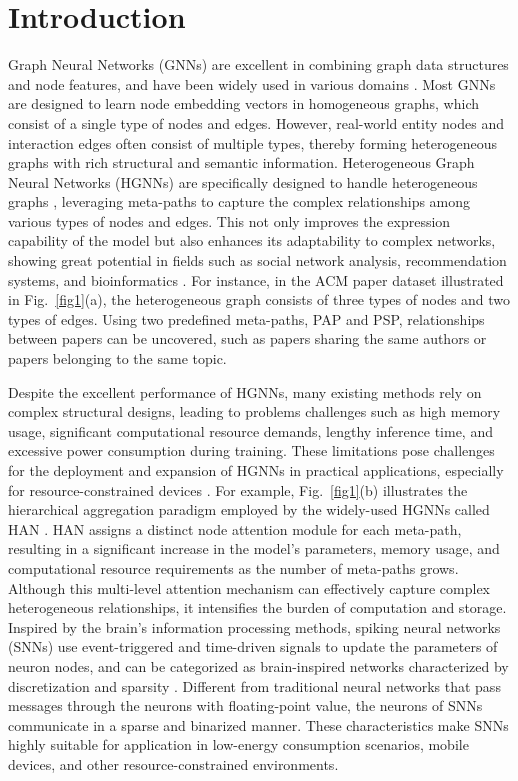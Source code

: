 \documentclass[letterpaper]{article} %
\begin{document}
\section{Introduction}

Graph Neural Networks (GNNs) are excellent in combining graph data structures and node features, and have been widely used in various domains \cite{bib1,bib2,bib3,bib4}. Most GNNs are designed to learn node embedding vectors in homogeneous graphs, which consist of a single type of nodes and edges. However, real-world entity nodes and interaction edges often consist of multiple types, thereby forming heterogeneous graphs with rich structural and semantic information. Heterogeneous Graph Neural Networks (HGNNs) are specifically designed to handle heterogeneous graphs \cite{bib5}, leveraging meta-paths to capture the complex relationships among various types of nodes and edges. This not only improves the expression capability of the model but also enhances its adaptability to complex networks, showing great potential in fields such as social network analysis, recommendation systems, and bioinformatics \cite{bib6,bib7,bib8}. For instance, in the ACM paper dataset illustrated in Fig.~\ref{fig1}(a), the heterogeneous graph consists of three types of nodes and two types of edges. Using two predefined meta-paths, PAP and PSP, relationships between papers can be uncovered, such as papers sharing the same authors or papers belonging to the same topic.

Despite the excellent performance of HGNNs, many existing methods rely on complex structural designs, leading to problems challenges such as high memory usage, significant computational resource demands, lengthy inference time, and excessive power consumption during training. These limitations pose challenges for the deployment and expansion of HGNNs in practical applications, especially for resource-constrained devices \cite{bib9}. For example, Fig.~\ref{fig1}(b) illustrates the hierarchical aggregation paradigm employed by the widely-used HGNNs called HAN \cite{bib10}. HAN assigns a distinct node attention module for each meta-path, resulting in a significant increase in the model’s parameters, memory usage, and computational resource requirements as the number of meta-paths grows. Although this multi-level attention mechanism can effectively capture complex heterogeneous relationships, it intensifies the burden of computation and storage. Inspired by the brain's information processing methods, spiking neural networks (SNNs) use event-triggered and time-driven signals to update the parameters of neuron nodes, and can be categorized as brain-inspired networks characterized by discretization and sparsity \cite{bib11,bib12}. Different from traditional neural networks that pass messages through the neurons with floating-point value, the neurons of SNNs communicate in a sparse and binarized manner. These characteristics make SNNs highly suitable for application in low-energy consumption scenarios, mobile devices, and other resource-constrained environments.
\end{document}
